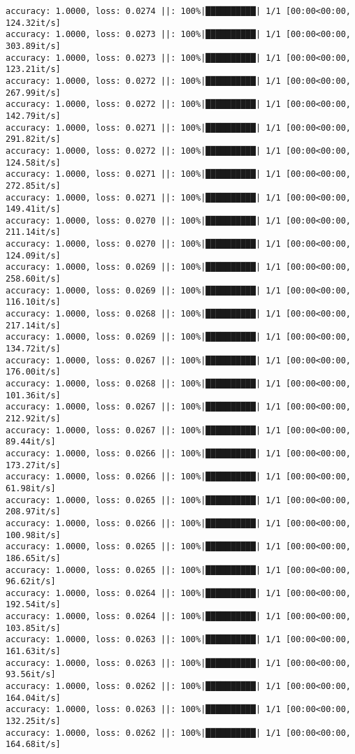 \documentclass[
]{article}
\begin{document}
\begin{verbatim}
accuracy: 1.0000, loss: 0.0274 ||: 100%|██████████| 1/1 [00:00<00:00, 124.32it/s]
accuracy: 1.0000, loss: 0.0273 ||: 100%|██████████| 1/1 [00:00<00:00, 303.89it/s]
accuracy: 1.0000, loss: 0.0273 ||: 100%|██████████| 1/1 [00:00<00:00, 123.21it/s]
accuracy: 1.0000, loss: 0.0272 ||: 100%|██████████| 1/1 [00:00<00:00, 267.99it/s]
accuracy: 1.0000, loss: 0.0272 ||: 100%|██████████| 1/1 [00:00<00:00, 142.79it/s]
accuracy: 1.0000, loss: 0.0271 ||: 100%|██████████| 1/1 [00:00<00:00, 291.82it/s]
accuracy: 1.0000, loss: 0.0272 ||: 100%|██████████| 1/1 [00:00<00:00, 124.58it/s]
accuracy: 1.0000, loss: 0.0271 ||: 100%|██████████| 1/1 [00:00<00:00, 272.85it/s]
accuracy: 1.0000, loss: 0.0271 ||: 100%|██████████| 1/1 [00:00<00:00, 149.41it/s]
accuracy: 1.0000, loss: 0.0270 ||: 100%|██████████| 1/1 [00:00<00:00, 211.14it/s]
accuracy: 1.0000, loss: 0.0270 ||: 100%|██████████| 1/1 [00:00<00:00, 124.09it/s]
accuracy: 1.0000, loss: 0.0269 ||: 100%|██████████| 1/1 [00:00<00:00, 258.60it/s]
accuracy: 1.0000, loss: 0.0269 ||: 100%|██████████| 1/1 [00:00<00:00, 116.10it/s]
accuracy: 1.0000, loss: 0.0268 ||: 100%|██████████| 1/1 [00:00<00:00, 217.14it/s]
accuracy: 1.0000, loss: 0.0269 ||: 100%|██████████| 1/1 [00:00<00:00, 134.72it/s]
accuracy: 1.0000, loss: 0.0267 ||: 100%|██████████| 1/1 [00:00<00:00, 176.00it/s]
accuracy: 1.0000, loss: 0.0268 ||: 100%|██████████| 1/1 [00:00<00:00, 101.36it/s]
accuracy: 1.0000, loss: 0.0267 ||: 100%|██████████| 1/1 [00:00<00:00, 212.92it/s]
accuracy: 1.0000, loss: 0.0267 ||: 100%|██████████| 1/1 [00:00<00:00, 89.44it/s]
accuracy: 1.0000, loss: 0.0266 ||: 100%|██████████| 1/1 [00:00<00:00, 173.27it/s]
accuracy: 1.0000, loss: 0.0266 ||: 100%|██████████| 1/1 [00:00<00:00, 61.98it/s]
accuracy: 1.0000, loss: 0.0265 ||: 100%|██████████| 1/1 [00:00<00:00, 208.97it/s]
accuracy: 1.0000, loss: 0.0266 ||: 100%|██████████| 1/1 [00:00<00:00, 100.98it/s]
accuracy: 1.0000, loss: 0.0265 ||: 100%|██████████| 1/1 [00:00<00:00, 186.65it/s]
accuracy: 1.0000, loss: 0.0265 ||: 100%|██████████| 1/1 [00:00<00:00, 96.62it/s]
accuracy: 1.0000, loss: 0.0264 ||: 100%|██████████| 1/1 [00:00<00:00, 192.54it/s]
accuracy: 1.0000, loss: 0.0264 ||: 100%|██████████| 1/1 [00:00<00:00, 103.85it/s]
accuracy: 1.0000, loss: 0.0263 ||: 100%|██████████| 1/1 [00:00<00:00, 161.63it/s]
accuracy: 1.0000, loss: 0.0263 ||: 100%|██████████| 1/1 [00:00<00:00, 93.56it/s]
accuracy: 1.0000, loss: 0.0262 ||: 100%|██████████| 1/1 [00:00<00:00, 164.04it/s]
accuracy: 1.0000, loss: 0.0263 ||: 100%|██████████| 1/1 [00:00<00:00, 132.25it/s]
accuracy: 1.0000, loss: 0.0262 ||: 100%|██████████| 1/1 [00:00<00:00, 164.68it/s]

\end{verbatim}
\end{document}
